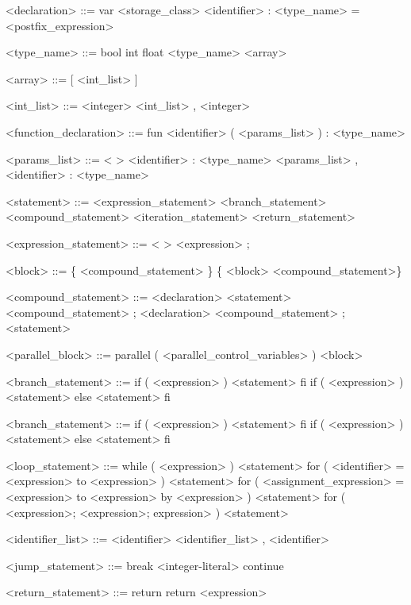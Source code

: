 \begin{grammar}
<declaration> ::=  var <storage_class> <identifier> : <type_name> = <postfix_expression>

<type_name> ::= bool
	\alt int
	\alt float
	\alt <type_name> <array>

<array> ::= [ <int_list> ]
	\alt [ <array> ]

<int_list> ::= <integer>
	\alt <int_list> , <integer>

<function_declaration> ::= fun <identifier> ( <params_list> ) : <type_name>

<params_list> ::= < > 
	\alt <identifier> : <type_name> 
	\alt <params_list> , <identifier> : <type_name>

<statement> ::= <expression_statement>
	\alt <branch_statement>
	\alt <compound_statement>
	\alt <iteration_statement>
	\alt <return_statement>

<expression_statement> ::= < >
	\alt <expression> ;

<block> ::= \{ <compound_statement> \}
	\alt \{ <block> <compound_statement>\}

<compound_statement> ::= <declaration>
	\alt <statement>
	\alt <compound_statement> ; <declaration>
	\alt <compound_statement> ; <statement>

<parallel_block> ::= parallel ( <parallel_control_variables> ) <block>

<branch_statement> ::= if ( <expression> ) <statement> fi
	\alt if ( <expression> ) <statement> else <statement> fi

<branch_statement> ::= if ( <expression> ) <statement> fi
	\alt if ( <expression> ) <statement> else <statement> fi

<loop_statement> ::= while ( <expression> ) <statement>
	\alt for ( <identifier> = <expression> to <expression> ) <statement>
	\alt for ( <assignment_expression> = <expression> to <expression> by <expression> ) <statement>
	\alt for ( <expression>; <expression>; expression> ) <statement>

<identifier_list> ::= <identifier>
	\alt <identifier_list> , <identifier>

<jump_statement> ::= break <integer-literal>
	\alt continue

<return_statement> ::= return 
	\alt return <expression>
\end{grammar}






















